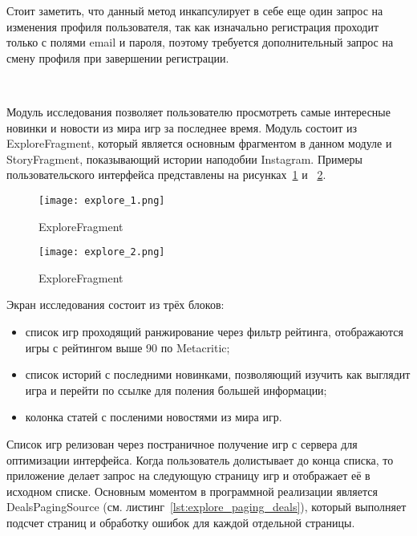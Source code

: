 Стоит заметить, что данный метод инкапсулирует в себе еще один запрос на изменения профиля пользователя, так как изначально регистрация проходит только с полями email и пароля, поэтому требуется дополнительный запрос на смену профиля при завершении регистрации.

~\par
Модуль исследования позволяет пользователю просмотреть самые интересные новинки и новости из мира игр за последнее время. Модуль состоит из ExploreFragment, который является основным фрагментом в данном модуле и StoryFragment, показывающий истории наподобии Instagram. Примеры пользовательского интерфейса представлены на рисунках~\ref{fig:arch:explore_1} и ~\ref{fig:arch:explore_2}.

\begin{figure}[H]
 \centering
   \texttt{[image: explore\_1.png]} 
   \caption{ExploreFragment}
   \label{fig:arch:explore_1}
\end{figure}

\begin{figure}[H]
 \centering
   \texttt{[image: explore\_2.png]} 
   \caption{ExploreFragment}
   \label{fig:arch:explore_2}
\end{figure}

Экран исследования состоит из трёх блоков:

\begin{itemize}
  \item список игр проходящий ранжирование через фильтр рейтинга, отображаются игры с рейтингом выше 90 по Metacritic;
  \item список историй с последними новинками, позволяющий изучить как выглядит игра и перейти по ссылке для поления большей информации;
  \item колонка статей с посленими новостями из мира игр.
\end{itemize}

Список игр релизован через постраничное получение игр с сервера для оптимизации интерфейса. Когда пользователь долистывает до конца списка, то приложение делает запрос на следующую страницу игр и отображает её в исходном списке. Основным моментом в программной реализации является DealsPagingSource (см. листинг~\ref{lst:explore_paging_deals}), который выполняет подсчет страниц и обработку ошибок для каждой отдельной страницы.

